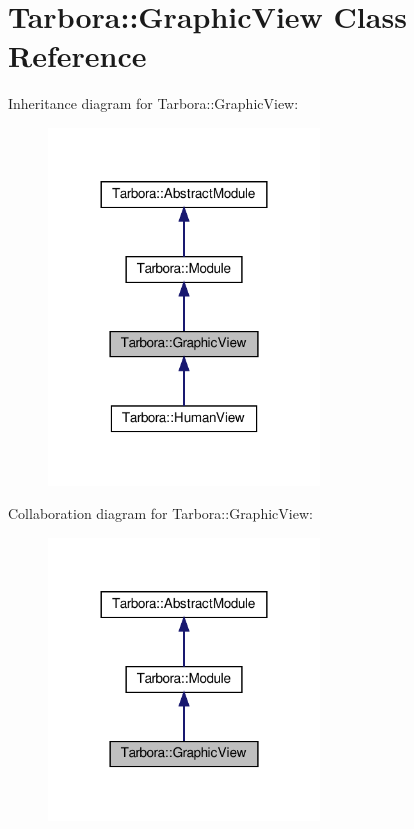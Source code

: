 \hypertarget{classTarbora_1_1GraphicView}{}\section{Tarbora\+:\+:Graphic\+View Class Reference}
\label{classTarbora_1_1GraphicView}


Inheritance diagram for Tarbora\+:\+:Graphic\+View\+:\nopagebreak
\begin{figure}[H]
\begin{center}
\leavevmode
\includegraphics[width=204pt]{classTarbora_1_1GraphicView__inherit__graph}
\end{center}
\end{figure}


Collaboration diagram for Tarbora\+:\+:Graphic\+View\+:\nopagebreak
\begin{figure}[H]
\begin{center}
\leavevmode
\includegraphics[width=204pt]{classTarbora_1_1GraphicView__coll__graph}
\end{center}
\end{figure}
